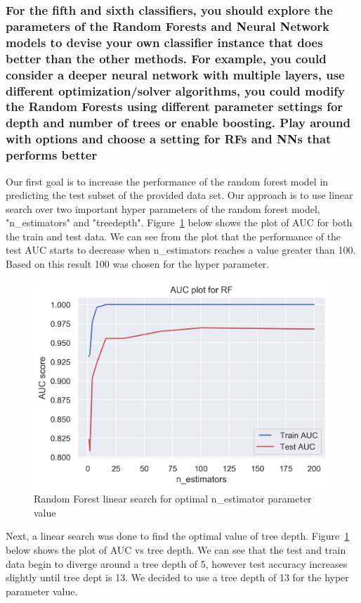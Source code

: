 \subsubsection{For the fifth and sixth classifiers, you should explore the parameters of the Random Forests and Neural Network models to devise your own classifier instance that does better than the other methods. For example, you could consider a deeper neural network with multiple layers, use different optimization/solver algorithms, you could modify the Random Forests using different parameter settings for depth and number of trees or enable boosting. Play around with options and choose a setting for RFs and NNs that performs better}

Our first goal is to increase the performance of the random forest model in predicting the test subset of the provided data set. Our approach is to use linear search over two important hyper parameters of the random forest model, "n\_estimators" and "treedepth". Figure~\ref{fig:rfnest} below shows the plot of AUC for both the train and test data. We can see from the plot that the performance of the test AUC starts to decrease when n\_estimators reaches a value greater than 100. Based on this result 100 was chosen for the hyper parameter. 


\begin{figure}[!ht]
 \centering
\includegraphics[width=6.1in]{assignment2/2-3-b-rf(n_estimator).png}
\caption{\label{fig:rfnest} Random Forest linear search for optimal n\_estimator parameter value}
\end{figure}

\clearpage{}
Next, a linear search was done to find the optimal value of tree depth. Figure~\ref{fig:rfnest} below shows the plot of AUC vs tree depth. We can see that the test and train data begin to diverge around a tree depth of 5, however test accuracy increases slightly until tree dept is 13. We decided to use a tree depth of 13 for the hyper parameter value.


